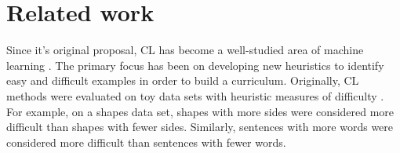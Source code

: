 \documentclass[letterpaper]{article} %
\begin{document}
\begin{comment} 
\subsection{Performance by Difficulty}
Does using DCL-IRT for training lead to a more interpretable output in terms of test set performance?
That is, when a curriculum is employed, does the model perform better on easier test examples than difficult ones?
A comparison of methods on test data binned by difficulty shows that model performance is similar when test set difficulty is taken into account (Figure XX).
The main difference is that for the baseline models, performance is stratified by difficulty almost immediately, and there are small improvements across groups during training, while for the CL methods, there is consistent improvement across groups as training continues, and more data is added. 
\end{comment} 

\section{Related work}

Since it's original proposal, CL has become a well-studied area of machine learning \cite{bengio_curriculum_2009}.
The primary focus has been on developing new heuristics to identify easy and difficult examples in order to build a curriculum. 
Originally, CL methods were evaluated on toy data sets with heuristic measures of difficulty \cite{bengio_curriculum_2009}.
For example, on a shapes data set, shapes with more sides were considered more difficult than shapes with fewer sides.
Similarly, sentences with more words were considered more difficult than sentences with fewer words.

\begin{comment}
Further work on CL has looked at estimating example difficulty by querying the model being trained (CITE EXAMPLES).
Model confidence, example entropy, and other metrics (LIST) have been considered as proxies for difficulty.
However, these all assume that a model uncertainty is equivalent to difficulty.
It is often the case, particularly in deep learning, that a model will overestimate confidence for examples due to the fact that the model is incentivized to push output probabilities to 1 for training examples (CITE ZOUBIN's work here).
These output probabilities are not aligned with a notion of difficulty, and may negatively impact the estimation of such.
What's more, most work relies on a rigid schedule that does not take into account the competency of the model at a point in the training process.
\end{comment} 
\end{document}
